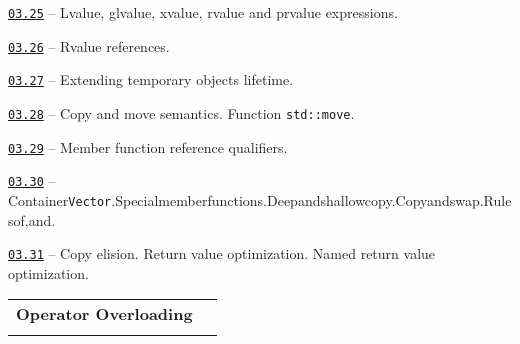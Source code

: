 \documentclass[a4paper,12pt]{article}
\renewenvironment{itemize}
{
    \begin{list}{\labelitemi}
    {
      \setlength{\topsep}{0pt}
      \setlength{\partopsep}{0pt}
      \setlength{\parskip}{0pt}
      \setlength{\itemsep}{0pt}
      \setlength{\parsep}{0pt}
      \setlength{\leftmargin}{14.5pt}
    }
}{\end{list}}
\begin{document}
\begin{itemize}

    \item \href{https://github.com/i-s-m-mipt/Education/blob/master/projects/examples/source/03.25.pdf}{\texttt{03.25}} -- Lvalue, glvalue, xvalue, rvalue and prvalue expressions.

    \smallskip

    \item \href{https://github.com/i-s-m-mipt/Education/blob/master/projects/examples/source/03.26.cpp}{\texttt{03.26}} -- Rvalue references.

    \smallskip

    \item \href{https://github.com/i-s-m-mipt/Education/blob/master/projects/examples/source/03.27.cpp}{\texttt{03.27}} -- Extending temporary objects lifetime.

    \smallskip

    \item \href{https://github.com/i-s-m-mipt/Education/blob/master/projects/examples/source/03.28.cpp}{\texttt{03.28}} -- Copy and move semantics. Function \lstinline{std::move}.

    \smallskip

    \item \href{https://github.com/i-s-m-mipt/Education/blob/master/projects/examples/source/03.29.cpp}{\texttt{03.29}} -- Member function reference qualifiers.

    \smallskip

    \item \href{https://github.com/i-s-m-mipt/Education/blob/master/projects/examples/source/03.30.cpp}{\texttt{03.30}} -- Container\:\lstinline{Vector}.\:Special\:member\:functions.\:Deep\:and\:shallow\:copy.\:Copy\:and\:swap.\:Rules\:of,\:and.

    \smallskip

    \item \href{https://github.com/i-s-m-mipt/Education/blob/master/projects/examples/source/03.31.cpp}{\texttt{03.31}} -- Copy elision. Return value optimization. Named return value optimization.

\end{itemize}

\bigskip\medskip

\begin{tabular}{!{\vrule width 1pt}L{4.3cm}!{\vrule width 1pt}L{14.7cm}!{\vrule width 0pt}} 


\textbf{Operator Overloading} & \\


\end{tabular}
\end{document}
